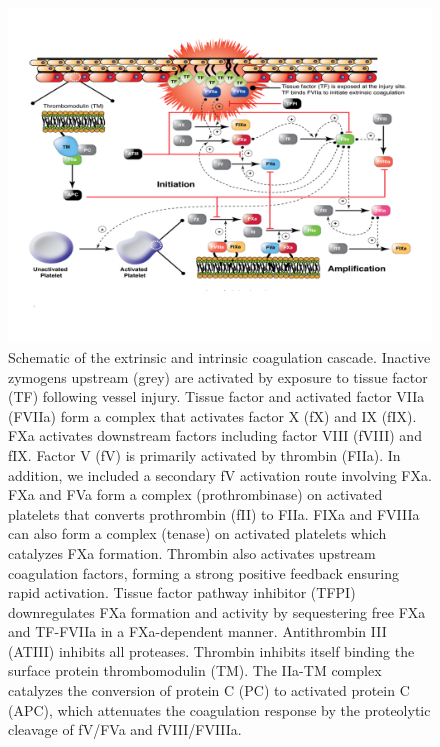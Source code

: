 \documentclass[12pt]{article}
\begin{document}
\begin{figure}[h]
\centering
\includegraphics[width=1.00\textwidth,height=0.7\textheight]{./figs/Figure_2_CoagulationNetwork.pdf}
\caption{Schematic of the extrinsic and intrinsic coagulation cascade. Inactive zymogens upstream (grey) are activated by exposure to tissue factor (TF)  following vessel injury. Tissue factor and activated factor VIIa (FVIIa) form a complex that activates factor X (fX) and IX (fIX). FXa activates downstream factors including factor VIII (fVIII) and fIX. Factor V (fV) is primarily activated by thrombin (FIIa). In addition, we included a secondary fV activation route involving FXa. FXa and FVa form a complex (prothrombinase) on activated platelets that converts prothrombin (fII) to FIIa. FIXa and FVIIIa can also form a complex (tenase) on activated platelets which catalyzes FXa formation.  Thrombin also activates upstream coagulation factors, forming a strong positive feedback ensuring rapid activation. Tissue factor pathway inhibitor (TFPI) downregulates FXa formation and activity by sequestering free FXa and TF-FVIIa in a FXa-dependent manner. Antithrombin III (ATIII)  inhibits all proteases. Thrombin inhibits itself binding the surface protein thrombomodulin (TM). The IIa-TM complex catalyzes the conversion of protein C (PC) to activated protein C (APC), which attenuates the coagulation response by the proteolytic cleavage of fV/FVa and fVIII/FVIIIa. }\label{fig-coagulation-network}
\end{figure}

\clearpage
\end{document}
